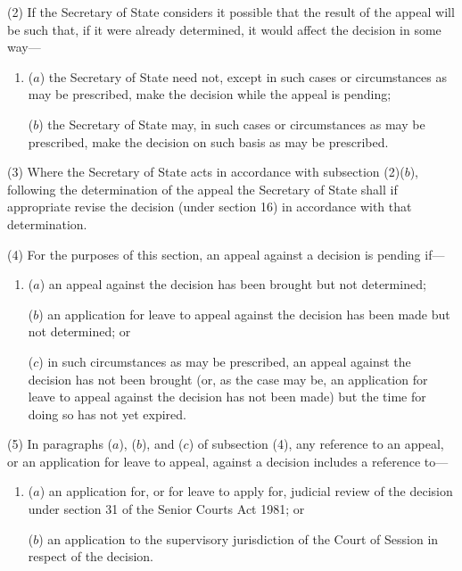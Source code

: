 \documentclass[a4paper]{article}
\begin{document}
(2) If the Secretary of State considers it possible that the result of the appeal will be such that, if it were already determined, it would affect the decision in some way---
\begin{enumerate}\item[]
($a$) the Secretary of State need not, except in such cases or circumstances as may be prescribed, make the decision while the appeal is pending;

($b$) the Secretary of State may, in such cases or circumstances as may be prescribed, make the decision on such basis as may be prescribed.
\end{enumerate}

(3) Where the Secretary of State acts in accordance with subsection (2)($b$), following the determination of the appeal the Secretary of State shall if appropriate revise the decision (under section 16) in accordance with that determination.

(4) For the purposes of this section, an appeal against a decision is pending if---
\begin{enumerate}\item[]
($a$) an appeal against the decision has been brought but not determined;

($b$) an application for leave to appeal against the decision has been made but not determined; or

($c$) in such circumstances as may be prescribed, an appeal against the decision has not been brought (or, as the case may be, an application for leave to appeal against the decision has not been made) but the time for doing so has not yet expired.
\end{enumerate}

(5) In paragraphs ($a$), ($b$), and ($c$) of subsection (4), any reference to an appeal, or an application for leave to appeal, against a decision includes a reference to---
\begin{enumerate}\item[]
($a$) an application for, or for leave to apply for, judicial review of the decision under section 31 of the Senior Courts Act 1981; or

($b$) an application to the supervisory jurisdiction of the Court of Session in respect of the decision.
\end{enumerate}
\end{document}
